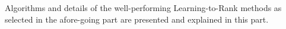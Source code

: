 Algorithms and details of the well-performing Learning-to-Rank methods as selected in the afore-going part are presented and explained in this part.
